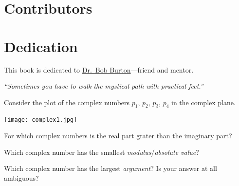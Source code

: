 \documentclass{workbook}
\begin{document}






\hypersetup{bookmarksdepth=3}

\pagestyle{empty}



\newpage

\begin{bookonly}
	\clearpage
	\hbox{}
	\newpage
	
	\section*{Contributors}
	
	\section*{Dedication}
	\begin{center}
		This book is dedicated to
		\href{https://www.gazettetimes.com/news/local/obituaries/dr-robert-main-burton/article_9c087f07-c005-515a-bb3f-2c9c6a6b7332.html}{\color{blue}Dr.~Bob Burton}---friend and mentor.

		\emph{\large ``Sometimes you have to walk the mystical path with practical feet.''}
	\end{center}
	\newpage
	\mbox{}
	{
		\pagestyle{empty}
		\setcounter{tocdepth}{1}
		\tableofcontents
		\thispagestyle{empty}
	}
	\newpage
	\mbox{}
	\newpage
\end{bookonly}

\setcounter{page}{1}
\pagestyle{siefken}




%
%

\begin{slide}
	\question
	Consider the plot of the complex numbers $p_1$, $p_2$, $p_3$, $p_4$ in the complex plane.

	\texttt{[image: complex1.jpg]}

	\begin{parts}
		\item For which complex numbers is the real part grater than the imaginary part?
		\item Which complex number has the smallest \emph{modulus}/\emph{absolute value}?
		\item Which complex number has the largest \emph{argument}?
		Is your answer at all ambiguous?
	\end{parts}
\end{slide}
\end{document}
